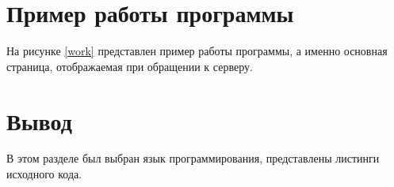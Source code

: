 \section{Пример работы программы}

На рисунке \ref{work} представлен пример работы программы, а именно основная страница, отображаемая при обращении к серверу.

\pagebreak


\section*{Вывод}

В этом разделе был выбран язык программирования, представлены листинги исходного кода.